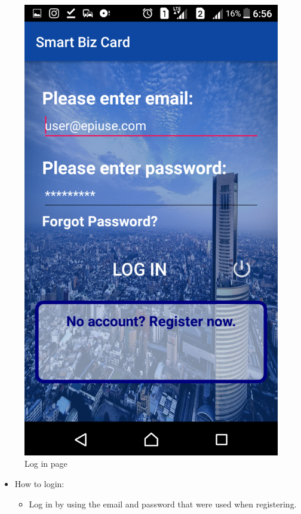 \documentclass[english]{article}
\begin{document}
			\begin{figure}[H]
				\centering
			\includegraphics[scale=0.3]{Login.png}
				\caption{Log in page}
				\label{figure: 1}
			\end{figure}

	\begin{itemize}
		\item How to login:
		\begin{itemize}
			\item Log in by using the email and password that were used when registering.
		\end{itemize}	
	\end{itemize}
\end{document}
